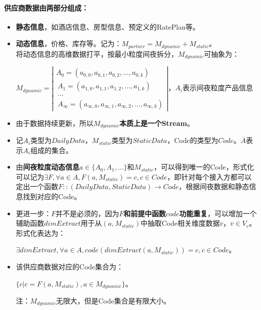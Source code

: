 \documentclass[a4paper]{article}
\begin{document}
\paragraph{供应商数据由两部分组成：}
\begin{itemize}
    \item \textbf{静态信息}，如酒店信息、房型信息、预定义的RatePlan等。
    \item \textbf{动态信息}，价格、库存等。记为：$M_{partner}=M_{dynamic}+M_{static}$。\\
    将动态信息的高维数据打平，按最小粒度间夜拆分，$M_{dynamic}$可抽象为：
    \begin{center}
        $M_{dynamic}=\left|\begin{array}{ccc}
            A_0=(a_{0,0},a_{0,1},a_{0,2}, \dots, a_{0,k}) \\\
            A_1=(a_{1,0},a_{1,1},a_{1,2}, \dots, a_{1,k}) \\\
            \dots \\\
            A_{\infty}=(a_{\infty,0},a_{\infty,1},a_{\infty,2},\dots,a_{\infty,k}) 
        \end{array} \right|，A_{i}$表示间夜粒度产品信息
    \end{center}
    \item 由于数据持续更新，所以\textbf{$M_{dynamic}$本质上是一个Stream}。
    \item 记$A_i$类型为$DailyData$，$M_{static}$类型为$StaticData$，Code的类型为$Code$。$A$表示$A_i$组成的集合。
    \item 由\textbf{间夜粒度动态信息}$a\in \{A_0,A_1,...\}$和$M_{static}$，可以得到唯一的Code，形式化可以记为$\exists F,  \forall a \in A, F(a,M_{static}) = c ,  c\in Code$，即针对每个接入方都可以定出一个函数$F::(DailyData, StaticData) \to Code$，根据间夜数据和静态信息找到对应的Code。
    \item 更进一步：$F$并不是必须的，因为\textbf{$F$和前提中函数$code$功能重复}，可以增加一个辅助函数$dimExtract$用于从$(a, M_{static})$中抽取Code相关维度数据$\overline v，\overline v \in V_c$。形式化表达为：
    \begin{center}
        $\exists dimExtract,  \forall a \in A, code(dimExtract(a,M_{static})) = c ,  c\in Code$。
    \end{center}
    \item 该供应商数据对应的Code集合为：
    \begin{center}
        $\{ c | c = F(a, M_{static}), a \in M_{dynamic}\}$。
    \end{center}
    注：$M_{dynamic}$无限大，但是Code集合是有限大小。
\end{itemize}
\end{document}

